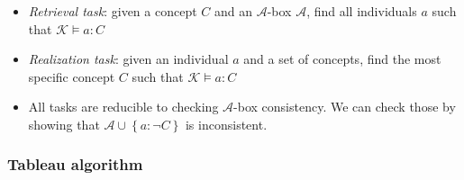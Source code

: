 \begin{itemize}
\begin{itemize}
		\item \textit{Retrieval task}: given a concept $C$ and an $\mathcal{A}$-box $\mathcal{A}$, find all individuals $a$ such that $\mathcal{K}\models a:C$
		\item \textit{Realization task}: given an individual $a$ and a set of concepts, find the most specific concept $C$ such that $\mathcal{K}\models a:C$
		\item All tasks are reducible to checking $\mathcal{A}$-box consistency. We can check those by showing that $\mathcal{A} \cup \left\{a:\lnot C\right\}$ is inconsistent.
	\end{itemize}
\end{itemize}
\subsubsection{Tableau algorithm}
\label{sec:tableau_algorithm}
